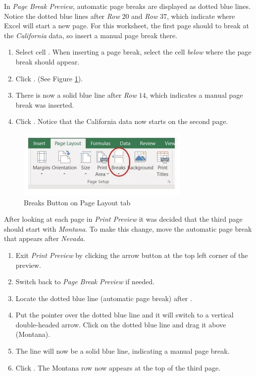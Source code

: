 In \textit{Page Break Preview}, automatic page breaks are displayed as dotted blue lines. Notice the dotted blue lines after \textit{Row} $ 20 $ and \textit{Row} $ 37 $, which indicate where Excel will start a new page. For this worksheet, the first page should to break at the \textit{California} data, so insert a manual page break there.

\begin{enumerate}
	\item Select cell . When inserting a page break, select the cell \textit{below} where the page break should appear.
	\item Click . (See Figure \ref{03:fig31}).
	\item There is now a solid blue line after \textit{Row} $ 14 $, which indicates a manual page break was inserted.
	\item Click . Notice that the California data now starts on the second page.
\end{enumerate}

\begin{figure}[H]
	\centering
	\includegraphics[width=\maxwidth{.95\linewidth}]{gfx/ch03_fig31}
	\caption{Breaks Button on Page Layout tab}
	\label{03:fig31}
\end{figure}

After looking at each page in \textit{Print Preview} it was decided that the third page should start with \textit{Montana}. To make this change, move the automatic page break that appears after \textit{Nevada}.

\begin{enumerate}
	\item Exit \textit{Print Preview} by clicking the arrow button at the top left corner of the preview.
	\item Switch back to \textit{Page Break Preview} if needed.
	\item Locate the dotted blue line (automatic page break) after .
	\item Put the pointer over the dotted blue line and it will switch to a vertical double-headed arrow. Click on the dotted blue line and drag it above  (Montana).
	\item The line will now be a solid blue line, indicating a manual page break.
	\item Click . The Montana row now appears at the top of the third page.
\end{enumerate}

